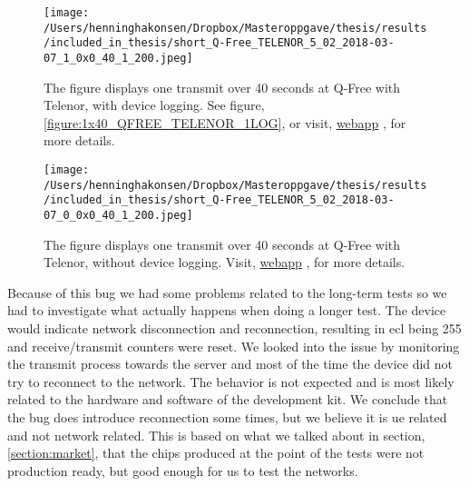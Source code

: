 \documentclass[USenglish]{ifimaster}  %
\begin{document}
\begin{figure}[H]
  \centering
  \texttt{[image: /Users/henninghakonsen/Dropbox/Masteroppgave/thesis/results/included\_in\_thesis/short\_Q-Free\_TELENOR\_5\_02\_2018-03-07\_1\_0x0\_40\_1\_200.jpeg]}
  \caption[Short-term test - loss of connection, with device logging]{The figure displays one transmit over 40 seconds at Q-Free with Telenor, with device logging. See figure, \vref{figure:1x40_QFREE_TELENOR_1LOG}, or visit, \href{http://158.39.77.97:9000/\#/results/Q-Free\_TELENOR\_5.02\_2018-03-07\_1\_0x0\_40\_1\_200}{webapp} \cite{online:result4}, for more details.}
  \label{figure:1x40_QFREE_TELENOR_1LOG_SHORT}
\end{figure}

\begin{figure}[H]
  \centering
  \texttt{[image: /Users/henninghakonsen/Dropbox/Masteroppgave/thesis/results/included\_in\_thesis/short\_Q-Free\_TELENOR\_5\_02\_2018-03-07\_0\_0x0\_40\_1\_200.jpeg]}
  \caption[Short-term test - loss of connection, without device logging]{The figure displays one transmit over 40 seconds at Q-Free with Telenor, without device logging. Visit, \href{http://158.39.77.97:9000/\#/results/Q-Free_TELENOR\_5.02\_2018-03-07\_0\_0x0\_40\_1\_200}{webapp} \cite{online:result3}, for more details.}
  \label{figure:1x40_QFREE_TELENOR_0LOG_SHORT}
\end{figure}

Because of this bug we had some problems related to the long-term tests so we had to investigate what actually happens when doing a longer test. The device would indicate network disconnection and reconnection, resulting in \acrshort{ecl} being 255 and receive/transmit counters were reset. We looked into the issue by monitoring the transmit process towards the server and most of the time the device did not try to reconnect to the network. The behavior is not expected and is most likely related to the hardware and software of the development kit. We conclude that the bug does introduce reconnection some times, but we believe it is \acrshort{ue} related and not network related. This is based on what we talked about in section, \vref{section:market}, that the chips produced at the point of the tests were not production ready, but good enough for us to test the networks.
\end{document}
